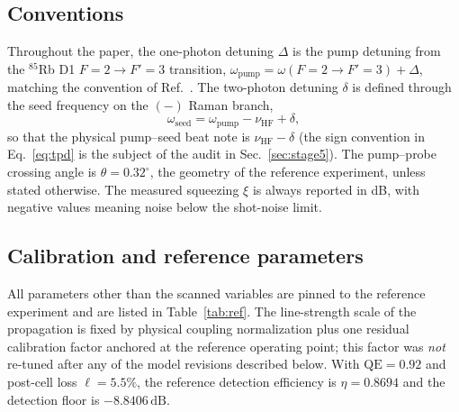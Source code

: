 \documentclass[11pt,a4paper]{article}
\newcommand{\dB}{\,\mathrm{dB}}
\newcommand{\Rb}{$^{85}$Rb}
\begin{document}
\subsection{Conventions}
\label{sec:conventions}
Throughout the paper, the one-photon detuning $\Delta$ is the pump detuning
from the \Rb{} D1 $F{=}2\to F'{=}3$ transition,
$\omega_{\mathrm{pump}}=\omega(F{=}2\to F'{=}3)+\Delta$, matching the
convention of Ref.~\cite{Sim2025}. The two-photon detuning $\delta$ is
defined through the seed frequency on the $(-)$ Raman branch,
\begin{equation}
\omega_{\mathrm{seed}}=\omega_{\mathrm{pump}}-\nu_{\mathrm{HF}}+\delta ,
\label{eq:tpd}
\end{equation}
so that the physical pump--seed beat note is $\nu_{\mathrm{HF}}-\delta$ (the
sign convention in Eq.~\eqref{eq:tpd} is the subject of the audit in
Sec.~\ref{sec:stage5}). The pump--probe crossing angle is
$\theta=0.32^{\circ}$, the geometry of the reference experiment, unless
stated otherwise. The measured squeezing $\xi$ is always reported in dB,
with negative values meaning noise below the shot-noise limit.

\subsection{Calibration and reference parameters}
All parameters other than the scanned variables are pinned to the reference
experiment \cite{Sim2025} and are listed in Table~\ref{tab:ref}. The
line-strength scale of the propagation is fixed by physical coupling
normalization plus one residual calibration factor anchored at the reference
operating point; this factor was \emph{not} re-tuned after any of the model
revisions described below. With $\mathrm{QE}=0.92$ and post-cell loss
$\ell=5.5\%$, the reference detection efficiency is $\eta=0.8694$ and the
detection floor is $-8.8406\dB$.
\end{document}
